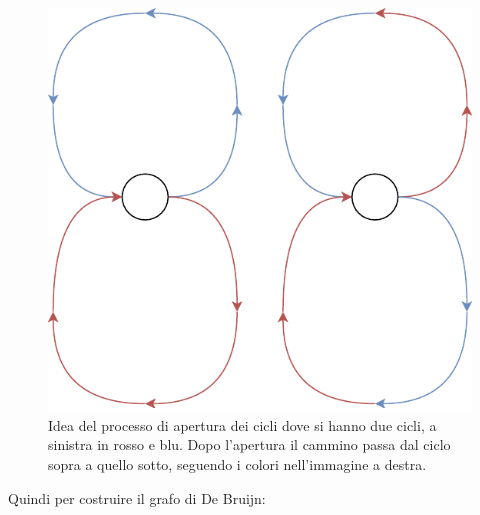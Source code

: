 \documentclass[a4paper,12pt, oneside]{book}
\begin{document}
  \begin{figure}
    \centering
    \includegraphics[scale = 0.7]{img/gra11.pdf}
    \caption{Idea del processo di apertura dei cicli dove si hanno due cicli, a
      sinistra in rosso e blu. Dopo l'apertura il cammino passa dal ciclo sopra a
      quello sotto, seguendo i colori nell'immagine a destra.}
    \label{fig:cic}
  \end{figure}
Quindi per costruire il grafo di De Bruijn:
\end{document}
